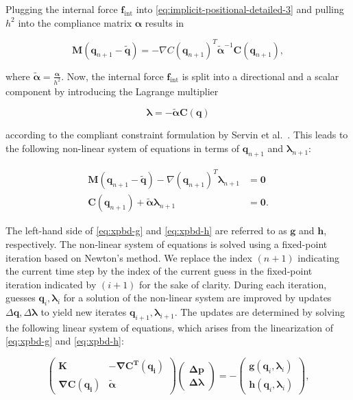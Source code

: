 \noindent Plugging the internal force $\bm{f}_{\text{int}}$ into \cref{eq:implicit-positional-detailed-3} and pulling $h^2$ into the 
compliance matrix $\bm{\alpha}$ results in

\[
    \bm{M}(\bm{q}_{n+1} - \bm{\tilde{q}}) = - \nabla C(\bm{q}_{n+1})^T \bm{\tilde{\alpha}}^{-1} \bm{C}(\bm{q}_{n+1}),
\]

\noindent where $\bm{\tilde{\alpha}} = \frac{\bm{\alpha}}{h^2}$. Now, the internal force $\bm{f}_{\text{int}}$ is split into a directional 
and a scalar component by introducing the Lagrange multiplier

\begin{equation}\label{eq:lagrange-multiplier}
    \bm{\lambda} = -\bm{\tilde{\alpha}\bm{C}(\bm{q})}
\end{equation}

\noindent according to the compliant constraint formulation by Servin et al.\ \cite{servin2006}. This leads to the following non-linear system
of equations in terms of $\bm{q}_{n+1}$ and $\bm{\lambda}_{n+1}$:

\begin{align}
    \bm{M}(\bm{q}_{n+1} - \bm{\tilde{q}}) - \nabla (\bm{q}_{n+1})^T \bm{\lambda}_{n+1} &= \bm{0} \label{eq:xpbd-g} \\
    \bm{C}(\bm{q}_{n+1}) + \bm{\tilde{\alpha}}\bm{\lambda}_{n+1} &= \bm{0} \label{eq:xpbd-h}.
\end{align}

\noindent The left-hand side of \cref{eq:xpbd-g} and \cref{eq:xpbd-h} are referred to as $\bm{g}$ and $\bm{h}$, respectively. The non-linear 
system of equations is solved using a fixed-point iteration based on Newton's method. We replace the index $(n+1)$ indicating the current
time step by the index of the current guess in the fixed-point iteration indicated by $(i+1)$ for the sake of clarity. During each iteration, 
guesses $\bm{q}_i, \bm{\lambda}_i$ for a solution of the non-linear system are improved by updates $\Delta \bm{q}, \Delta \bm{\lambda}$ to 
yield new iterates $\bm{q}_{i+1}, \bm{\lambda}_{i+1}$. The updates are determined by solving the following linear system of equations, 
which arises from the linearization of \cref{eq:xpbd-g} and \cref{eq:xpbd-h}:

\begin{equation}\label{eq:xpbd-lse}
    \begin{pmatrix}
        \bm{K} & \bm{-\nabla\bm{C}^T(\bm{q}_i)} \\
        \bm{\nabla \bm{C}(\bm{q}_i)} & \bm{\tilde{\alpha}}
    \end{pmatrix}
    \begin{pmatrix}
        \bm{\Delta \bm{p}} \\
        \bm{\Delta \bm{\lambda}}
    \end{pmatrix}
    = -
    \begin{pmatrix}
    \bm{g}(\bm{q}_i, \bm{\lambda}_i) \\
    \bm{h}(\bm{q}_i, \bm{\lambda}_i)
    \end{pmatrix},
\end{equation}

